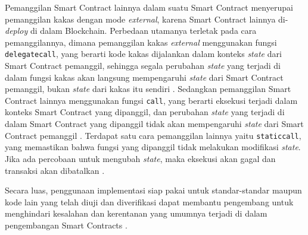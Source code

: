 Pemanggilan Smart Contract lainnya dalam suatu Smart Contract menyerupai pemanggilan kakas dengan mode \textit{external}, karena Smart Contract lainnya di-\textit{deploy} di dalam Blockchain. Perbedaan utamanya terletak pada cara pemanggilannya, dimana pemanggilan kakas \textit{external} menggunakan fungsi \texttt{delegatecall}, yang berarti kode kakas dijalankan dalam konteks \textit{state} dari Smart Contract pemanggil, sehingga segala perubahan \textit{state} yang terjadi di dalam fungsi kakas akan langsung mempengaruhi \textit{state} dari Smart Contract pemanggil, bukan \textit{state} dari kakas itu sendiri \parencite{rareskills_delegatecall}. Sedangkan pemanggilan Smart Contract lainnya menggunakan fungsi \texttt{call}, yang berarti eksekusi terjadi dalam konteks Smart Contract yang dipanggil, dan perubahan \textit{state} yang terjadi di dalam Smart Contract yang dipanggil tidak akan mempengaruhi \textit{state} dari Smart Contract pemanggil \parencite{rareskills_lowlevel}. Terdapat satu cara pemanggilan lainnya yaitu \texttt{staticcall}, yang memastikan bahwa fungsi yang dipanggil tidak melakukan modifikasi \textit{state}. Jika ada percobaan untuk mengubah \textit{state}, maka eksekusi akan gagal dan transaksi akan dibatalkan \parencite{rareskills_staticcall}.

Secara luas, penggunaan implementasi siap pakai untuk standar-standar maupun kode lain yang telah diuji dan diverifikasi dapat membantu pengembang untuk menghindari kesalahan dan kerentanan yang umumnya terjadi di dalam pengembangan Smart Contracts \parencite{consensys_duplication_reuse}.

